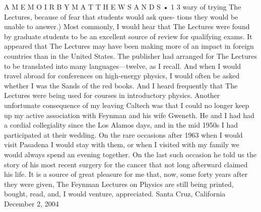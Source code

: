 \documentclass[10pt,oneside]{article}
\begin{document}
A  M E M O I R  B Y  M A T T H E W  S A N D S • 1 3 wary of trying The Lectures, because of fear that students would ask ques- tions they would be unable to answer.) Most commonly, I would hear that The Lectures were found by graduate students to be an excellent source of review for qualifying exams. It appeared that The Lectures may have been making more of an impact in foreign countries than in the United States. The publisher had arranged for The Lectures to be translated into many languages---twelve, as I recall. And when I would travel abroad for conferences on high-energy physics, I would often be asked whether I was the Sands of the red books. And I heard frequently that The Lectures were being used for courses in introductory physics. Another unfortunate consequence of my leaving Caltech was that I could no longer keep up my active association with Feynman and his wife Gweneth. He and I had had a cordial collegiality since the Los Alamos days, and in the mid 1950s I had participated at their wedding. On the rare occasions after 1963 when I would visit Pasadena I would stay with them, or when I visited with my family we would always spend an evening together. On the last such occasion he told us the story of his most recent surgery for the cancer that not long afterward claimed his life. It is a source of great pleasure for me that, now, some forty years after they were given, The Feynman Lectures on Physics are still being printed, bought, read, and, I would venture, appreciated. Santa Cruz, California December 2, 2004\par

\clearpage
{}
\end{document}
